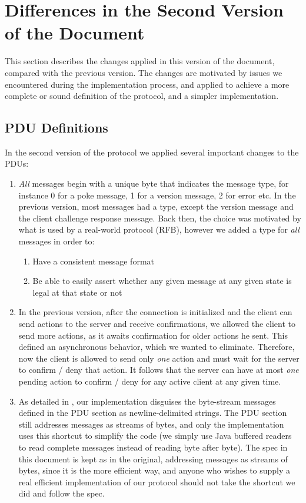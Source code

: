 \section{Differences in the Second Version of the Document}
\label{sec:diff}

This section describes the changes applied in this version of the document, compared with the previous version. The changes are motivated by issues we encountered during the implementation process, and applied to achieve a more complete or sound definition of the protocol, and a simpler implementation.

\subsection{PDU Definitions}
In the second version of the protocol we applied several important changes to the PDUs:
\begin{enumerate}
\item {\em All} messages begin with a unique byte that indicates the message type, for instance 0 for a poke message, 1 for a version message, 2 for error etc. In the previous version, most messages had a type, except the version message and the client challenge response message. Back then, the choice was motivated by what is used by a real-world protocol (RFB), however we added a type for {\em all} messages in order to:
    \begin{enumerate}
        \item Have a consistent message format
        \item Be able to easily assert whether any given message at any given state is legal at that state or not
    \end{enumerate}
\item In the previous version, after the connection is initialized and the client can send actions to the server and receive confirmations, we allowed the client to send more actions, as it awaits confirmation for older actions he sent. This defined an asynchronous behavior, which we wanted to eliminate.
    Therefore, now the client is allowed to send only {\em one} action and must wait for the server to confirm / deny that action. It follows that the server can have at most {\em one} pending action to confirm / deny for any active client at any given time.
\item As detailed in , our implementation disguises the byte-stream messages defined in the PDU section as newline-delimited strings. The PDU section still addresses messages as streams of bytes, and only the implementation uses this shortcut to simplify the code (we simply use Java buffered readers to read complete messages instead of reading byte after byte). The spec in this document is kept as in the original, addressing messages as streams of bytes, since it is the more efficient way, and anyone who wishes to supply a real efficient implementation of our protocol should not take the shortcut we did and follow the spec.
\end{enumerate}


